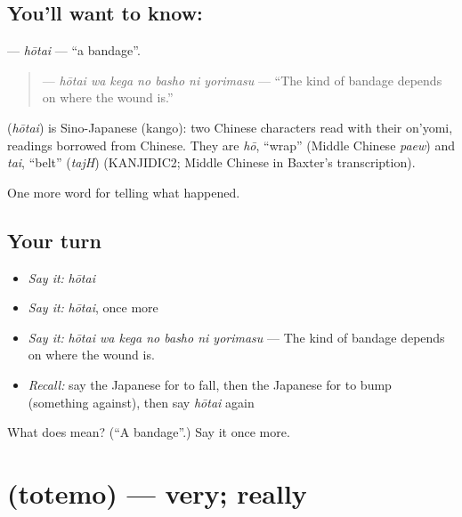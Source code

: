 \subsection*{You'll want to know: }
\textbf{} — \emph{hōtai} — \textquotedblleft{}a bandage\textquotedblright{}.

\begin{quote}
\textbf{   } — \emph{hōtai wa kega no basho ni yorimasu} — \textquotedblleft{}The kind of bandage depends on where the wound is.\textquotedblright{}
\end{quote}

\begin{cousinweb}
\textbf{} (\emph{hōtai}) is Sino-Japanese (kango): two Chinese characters read with their on'yomi, readings borrowed from Chinese. They are \emph{hō}, \textquotedblleft{}wrap\textquotedblright{} (Middle Chinese \emph{paew}) and \emph{tai}, \textquotedblleft{}belt\textquotedblright{} (\emph{tajH}) (KANJIDIC2; Middle Chinese in Baxter's transcription).
\end{cousinweb}

\begin{grammarlens}[title={What you've built}]
One more word for telling what happened.
\end{grammarlens}

\subsection*{Your turn}
\begin{itemize}
\raggedright
  \item \emph{Say it:} \emph{hōtai}
  \item \emph{Say it:} \emph{hōtai}, once more
  \item \emph{Say it:} \emph{hōtai wa kega no basho ni yorimasu} — The kind of bandage depends on where the wound is.
  \item \emph{Recall:} say the Japanese for to fall, then the Japanese for to bump (something against), then say \emph{hōtai} again
\end{itemize}

\begin{tcolorbox}[breakable,colback=teal!4,colframe=teal!35!black,title={Before you move on}]
What does  mean? (\textquotedblleft{}A bandage\textquotedblright{}.) Say it once more.
\end{tcolorbox}
\section[\texorpdfstring{\ja{とても} (totemo)}{とても (totemo)}]{ (totemo) — very; really}

